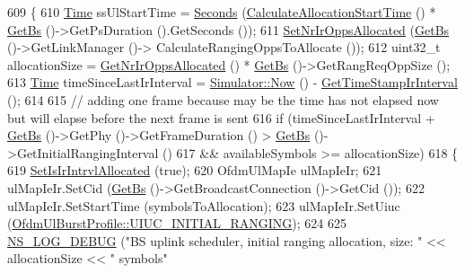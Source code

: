 \begin{DoxyCode}
609 \{
610   \hyperlink{namespacens3_1_1TracedValueCallback_a7ffd3e7c142ffe7c8a1d2db9b8de38ec}{Time} ssUlStartTime = \hyperlink{group__timecivil_ga33c34b816f8ff6628e33d5c8e9713b9e}{Seconds} (\hyperlink{classns3_1_1UplinkSchedulerRtps_ac5ae2f7c51fd1aa551813d0b12dc8013}{CalculateAllocationStartTime} () * 
      \hyperlink{classns3_1_1UplinkScheduler_afe61b7de71d92d2dff1b135744a6ff7e}{GetBs} ()->GetPsDuration ().GetSeconds ());
611   \hyperlink{classns3_1_1UplinkScheduler_a19208ce138c5e13b1a7019a67adef892}{SetNrIrOppsAllocated} (\hyperlink{classns3_1_1UplinkScheduler_afe61b7de71d92d2dff1b135744a6ff7e}{GetBs} ()->GetLinkManager ()->
      CalculateRangingOppsToAllocate ());
612   uint32\_t allocationSize = \hyperlink{classns3_1_1UplinkScheduler_a9a2cbb04c1e84a028fc1545e8f054b80}{GetNrIrOppsAllocated} () * \hyperlink{classns3_1_1UplinkScheduler_afe61b7de71d92d2dff1b135744a6ff7e}{GetBs} ()->GetRangReqOppSize 
      ();
613   \hyperlink{namespacens3_1_1TracedValueCallback_a7ffd3e7c142ffe7c8a1d2db9b8de38ec}{Time} timeSinceLastIrInterval = \hyperlink{classns3_1_1Simulator_ac3178fa975b419f7875e7105be122800}{Simulator::Now} () - 
      \hyperlink{classns3_1_1UplinkScheduler_aa7516e5a55b513a7640035a9783369c7}{GetTimeStampIrInterval} ();
614 
615   \textcolor{comment}{// adding one frame because may be the time has not elapsed now but will elapse before the next frame is
       sent}
616   \textcolor{keywordflow}{if} (timeSinceLastIrInterval + \hyperlink{classns3_1_1UplinkScheduler_afe61b7de71d92d2dff1b135744a6ff7e}{GetBs} ()->GetPhy ()->GetFrameDuration () > 
      \hyperlink{classns3_1_1UplinkScheduler_afe61b7de71d92d2dff1b135744a6ff7e}{GetBs} ()->GetInitialRangingInterval ()
617       && availableSymbols >= allocationSize)
618     \{
619       \hyperlink{classns3_1_1UplinkScheduler_a3eee0d06486678eab4d352a274676d95}{SetIsIrIntrvlAllocated} (\textcolor{keyword}{true});
620       OfdmUlMapIe ulMapIeIr;
621       ulMapIeIr.SetCid (\hyperlink{classns3_1_1UplinkScheduler_afe61b7de71d92d2dff1b135744a6ff7e}{GetBs} ()->GetBroadcastConnection ()->GetCid ());
622       ulMapIeIr.SetStartTime (symbolsToAllocation);
623       ulMapIeIr.SetUiuc (\hyperlink{classns3_1_1OfdmUlBurstProfile_ae528783c4b3c6700ff49dfd7a555cb3daaea7b6256d4bcd0125f0248c0560c94e}{OfdmUlBurstProfile::UIUC\_INITIAL\_RANGING});
624 
625       \hyperlink{group__logging_ga413f1886406d49f59a6a0a89b77b4d0a}{NS\_LOG\_DEBUG} (\textcolor{stringliteral}{"BS uplink scheduler, initial ranging allocation, size: "} << allocationSize
       << \textcolor{stringliteral}{" symbols"}

\end{DoxyCode}
